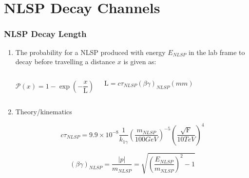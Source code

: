 \documentclass[12pt]{beamer}
\begin{document}
\section{NLSP Decay Channels}
\begin{frame}
\frametitle[c]{NLSP Decay Length}
\begin{enumerate}
\item 
The probability for a NLSP produced with energy $\displaystyle{E_{NLSP}}$ in the lab frame to decay before travelling a distance $x$ is given as:
\begin{columns}
\begin{varblock}[8.7cm]{}
\begin{equation}
\mathcal{P}(x) = 1 - \exp{\left(- \frac{x}{\mathrm{L}} \right)}
\end{equation}
 \end{varblock}
\begin{varblock}[8.15cm]{}
\begin{equation}
\mathrm{L} = c\tau_{NLSP}\left(\beta\gamma\right)_{NLSP} (mm)
\end{equation}
\end{varblock}
\end{columns}
\item Theory/kinematics
\begin{varblock}[16cm]{}
\begin{equation}
c\tau_{NLSP} = 9.9 \times 10^{-8}\frac{1}{k_{1\gamma}}\left(\frac{m_{NLSP}}{100 GeV}\right)^{-5}\left(\frac{\sqrt{\mathrm{F}}}{10TeV}\right)^{4}
\end{equation}
\end{varblock}
\begin{varblock}[16cm]{}
\begin{equation}
\left(\beta\gamma\right)_{NLSP} = \frac{|p|}{m_{NLSP}} = \sqrt{\left(\frac{E_{NLSP}}{m_{NLSP}}\right)^{2} - 1}
\end{equation}
\end{varblock}

\end{enumerate}
\end{frame}
\end{document}
